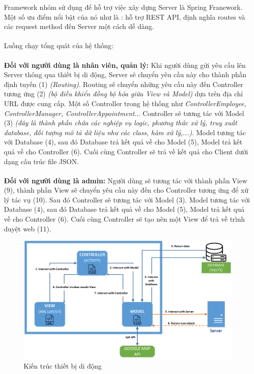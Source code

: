 \documentclass[a4paper]{article}
\begin{document}
Framework nhóm sử dụng để hỗ trợ việc xây dựng Server là Spring Franework. Một số ưu điểm nổi bật của nó như là : hỗ trợ REST API, định nghĩa routes và các request method đến Server một cách dễ dàng.\\
\\
Luồng chạy tổng quát của hệ thống:\\
\\
\textbf{Đối với người dùng là nhân viên, quản lý:} Khi người dùng gửi yêu cầu lên Server thông qua thiết bị di động, Server sẽ chuyển yêu cầu này cho thành phần định tuyến (1) \textit{(Routing)}. Routing sẽ chuyển những yêu cầu này đến Controller tương ứng (2) \textit{(bộ điều khiển đồng bộ hóa giữa View và Model)} dựa trên địa chỉ URL được cung cấp. Một số Controller trong hệ thống như \textit{ControllerEmployee, ControllerManager, ControllerAppointment}... Controller sẽ tương tác với Model (3) \textit{(đây là thành phần chứa các nghiệp vụ logic, phương thức xử lý, truy xuất database, đối tượng mô tả dữ liệu như các class, hàm xử lý,...)}. Model tương tác với Database (4), sau đó Database trả kết quả về cho Model (5), Model trả kết quả về cho Controller (6). Cuối cùng Controller sẽ trả về kết quả cho Client dưới dạng cấu trúc file JSON.\\
\\
\textbf{Đối với người dùng là admin:} Người dùng sẽ tương tác với thành phần View (9), thành phần View sẽ chuyển yêu cầu này đến cho Controller tương ứng để xử lý tác vụ (10). Sau đó Controller sẽ tương tác với Model (3). Model tương tác với Database (4), sau đó Database trả kết quả về cho Model (5), Model trả kết quả về cho Controller (6). Cuối cùng Controller sẽ tạo nên một View để trả về trình duyệt web (11).\\
\begin{figure}[!h]
    \includegraphics[scale=0.53]{mobile_architecture}
    \centering
    \caption{Kiến trúc thiết bị di động}
    \label{fig:mobile_architecture}
\end{figure}
\end{document}
